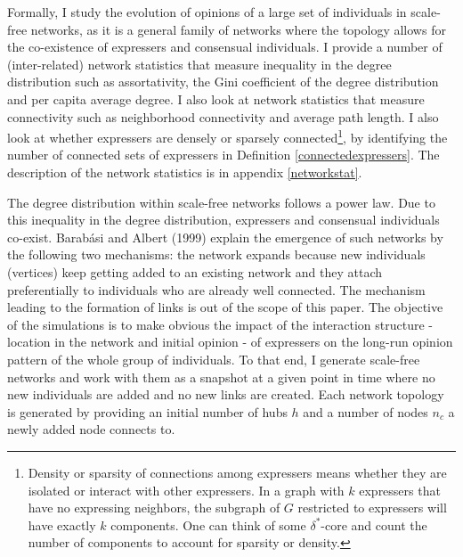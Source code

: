 \documentclass{article}
\begin{document}
Formally, I study the evolution of opinions of a large set of individuals in scale-free networks, as it is a general family of networks where the topology allows for the co-existence of expressers and consensual individuals. I provide a number of (inter-related) network statistics that measure inequality in the degree distribution such as assortativity, the Gini coefficient of the degree distribution and per capita average degree. I also look at network statistics that measure connectivity such as neighborhood connectivity and average path length. I also look at whether expressers are densely or sparsely connected\footnote{Density or sparsity of connections among expressers means whether they are isolated or interact with other expressers. In a graph with $k$ expressers that have no expressing neighbors, the subgraph of $G$ restricted to expressers will have exactly $k$ components. One can think of some $\delta^{*}$-core and count the number of components to account for sparsity or density.}, by identifying the number of connected sets of expressers in Definition \ref{connectedexpressers}. The description of the network statistics is in appendix \ref{networkstat}. 


The degree distribution within scale-free networks follows a power law. Due to this inequality in the degree distribution, expressers and consensual individuals co-exist.  Barab\'{a}si and Albert (1999)\cite{barabasi} explain the emergence of such networks by the following two mechanisms: the network expands because new individuals (vertices) keep getting added to an existing network and they attach preferentially to individuals who are already well connected. The mechanism leading to the formation of links is out of the scope of this paper. The objective of the simulations is to make obvious the impact of the interaction structure - location in the network and initial opinion - of expressers on the long-run opinion pattern of the whole group of individuals. To that end, I generate scale-free networks and work with them as a snapshot at a given point in time where no new individuals are added and no new links are created. Each network topology is generated by providing an initial number of hubs $h$ and a number of nodes $n_c$ a newly added node connects to. %
\end{document}
